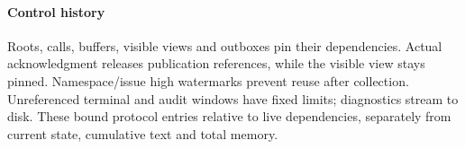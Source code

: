 \paragraph{Control history}
Roots, calls, buffers, visible views and outboxes pin their dependencies.
Actual acknowledgment releases publication references, while the visible
view stays pinned. Namespace/issue high watermarks prevent reuse after
collection. Unreferenced terminal and audit windows have fixed limits;
diagnostics stream to disk. These bound protocol entries relative to live
dependencies, separately from current state, cumulative text and total
memory.
